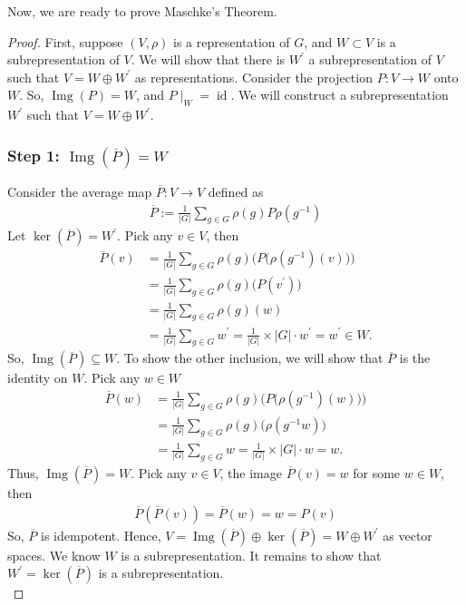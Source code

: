 Now, we are ready to prove Maschke's Theorem.
\begin{proof}

    First, suppose $(V, \rho)$ is a representation of $G$, and $W \subset V$ is a subrepresentation of $V$. We will show that there is $W^\prime$ a subrepresentation of $V$ such that $V = W \oplus W^\prime$ as representations.
    Consider the projection $P: V \to W$ onto $W$. So, $\operatorname{Img}(P) = W$, and $P\mid_W = \operatorname{id}$. We will construct a subrepresentation $W^\prime$ such that $V = W \oplus W^\prime$.

    \subsubsection*{Step 1: $\operatorname{Img}(\overline{P}) = W$}
    Consider the average map $\overline{P}: V \to V$ defined as
    \begin{align*}
        \overline{P} := \frac{1}{|G|} \sum_{g \in G} \rho(g) P \rho(g^{-1}) 
    \end{align*}
    Let $\ker(\overline{P}) = W^\prime$. Pick any $v \in V$, then 
    \begin{align*}
            \overline{P}(v) &= \frac{1}{|G|} \sum_{g \in G} \rho(g)\big( P \big(\rho(g^{-1})(v)\big)\big) \\
                            &= \frac{1}{|G|} \sum_{g \in G} \rho(g)\big( P(v^\prime)\big) \\
                            &= \frac{1}{|G|} \sum_{g \in G} \rho(g)(w)\\
                            &=\frac{1}{|G|} \sum_{g \in G} w^\prime = \frac{1}{|G|}\times|G| \cdot w^\prime = w^\prime\in W.
    \end{align*}
    So, $\operatorname{Img}(\overline{P}) \subseteq W$. To show the other inclusion, we will show that $\overline{P}$ is the identity on $W$. Pick any $w \in W$
    \begin{align*}
        \overline{P}(w) &= \frac{1}{|G|} \sum_{g \in G} \rho(g)\big( P \big(\rho(g^{-1})(w)\big)\big) \\
                            &= \frac{1}{|G|} \sum_{g \in G} \rho(g)\big( \rho(g^{-1} w)\big) \\
                            &= \frac{1}{|G|} \sum_{g \in G} w = \frac{1}{|G|}\times|G| \cdot w = w.
    \end{align*}
    Thus, $\operatorname{Img}(\overline{P}) = W$. Pick any $v \in V$, the image $\overline{P}(v) = w$ for some $w \in W$, then
    \begin{align*}
         \overline{P}(\overline{P}(v)) = \overline{P}(w) = w = P(v)
    \end{align*}
    So, $\overline{P}$ is idempotent. Hence, $V = \operatorname{Img}(\overline{P}) \oplus \ker(\overline{P}) = W \oplus W^\prime$ as vector spaces. We know $W$ is a subrepresentation. It remains to show that $W^\prime = \ker(\overline{P})$ is a subrepresentation.
   \\ 

\end{proof}
